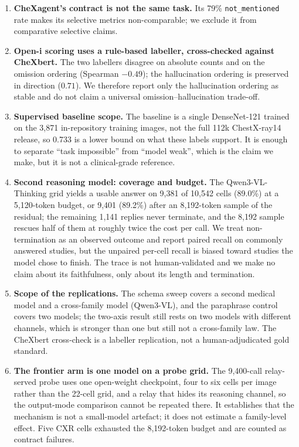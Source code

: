 \begin{enumerate}[leftmargin=1.2em,itemsep=2pt,topsep=2pt]
\item \textbf{CheXagent's contract is not the same task.} Its 79\% \texttt{not\_mentioned} rate makes its selective metrics non-comparable; we exclude it from comparative selective claims.
\item \textbf{Open-i scoring uses a rule-based labeller, cross-checked against CheXbert.} The two labellers disagree on absolute counts and on the omission ordering (Spearman $-0.49$); the hallucination ordering is preserved in direction ($0.71$). We therefore report only the hallucination ordering as stable and do not claim a universal omission--hallucination trade-off.
\item \textbf{Supervised baseline scope.} The baseline is a single DenseNet-121 trained on the 3,871 in-repository training images, not the full 112k ChestX-ray14 release, so 0.733 is a lower bound on what these labels support. It is enough to separate ``task impossible'' from ``model weak'', which is the claim we make, but it is not a clinical-grade reference.
\item \textbf{Second reasoning model: coverage and budget.} The Qwen3-VL-Thinking grid yields a usable answer on 9,381 of 10,542 cells (89.0\%) at a 5,120-token budget, or 9,401 (89.2\%) after an 8,192-token sample of the residual; the remaining 1,141 replies never terminate, and the 8,192 sample rescues half of them at roughly twice the cost per call. We treat non-termination as an observed outcome and report paired recall on commonly answered studies, but the unpaired per-cell recall is biased toward studies the model chose to finish. The trace is not human-validated and we make no claim about its faithfulness, only about its length and termination.
\item \textbf{Scope of the replications.} The schema sweep covers a second medical model and a cross-family model (Qwen3-VL), and the paraphrase control covers two models; the two-axis result still rests on two models with different channels, which is stronger than one but still not a cross-family law. The CheXbert cross-check is a labeller replication, not a human-adjudicated gold standard.
\item \textbf{The frontier arm is one model on a probe grid.} The 9,400-call relay-served probe uses one open-weight checkpoint, four to six cells per image rather than the 22-cell grid, and a relay that hides its reasoning channel, so the output-mode comparison cannot be repeated there. It establishes that the mechanism is not a small-model artefact; it does not estimate a family-level effect. Five CXR cells exhausted the 8,192-token budget and are counted as contract failures.

\end{enumerate}
